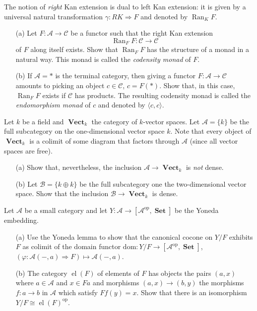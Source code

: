 \documentclass[12pt, a4paper]{article}
\DeclareMathOperator{\el}{el}
\DeclareMathOperator{\op}{op}
\DeclareMathOperator{\Ran}{Ran}
\DeclareMathOperator{\Vect}{\mathbf{Vect}}
\DeclareMathOperator{\Set}{\mathbf{Set}}
\newcommand{\ca}[1]{\mathscr{#1}}
\theoremstyle{plain}
\theoremstyle{definition}
\theoremstyle{citing}
\theoremstyle{citingdfn}
\numberwithin{equation}{section}
\begin{document}
\begin{question}
 The notion of \emph{right} Kan extension is dual to left Kan extension: it is given by a universal natural transformation $\gamma \colon RK \Rightarrow F$ and denoted by $\Ran_K F$.
 \begin{enumerate}
 \item[(a)] Let $F \colon \ca{A} \rightarrow \ca{C}$ be a functor such that the right Kan extension 
 \[
 \Ran_F F \colon \ca{C} \rightarrow \ca{C}
 \] 
 of $F$ along itself exists. Show that $\Ran_F F$ has the structure of a monad in a natural way. This monad is called the \emph{codensity monad} of $F$.
 \item[(b)] If $\ca{A}=\ast$ is the terminal category, then giving a functor $F \colon \ca{A} \rightarrow \ca{C}$ amounts to picking an object $c \in \ca{C}$, $c=F(\ast)$. Show that, in this case, $\Ran_F F$ exists if $\ca{C}$ has products. The resulting codensity monad is called the \emph{endomorphism monad} of $c$ and denoted by $\langle c,c\rangle$. 
\end{enumerate}  
\end{question}

\begin{question}
 Let $k$ be a field and $\Vect_{k}$ the category of $k$-vector spaces. Let $\ca{A}=\{k\}$ be the full subcategory on the one-dimensional vector space $k$. Note that every object of $\Vect_k$ is a colimit of some diagram that factors through $\ca{A}$ (since all vector spaces are free).
 
 \begin{enumerate}
 \item[(a)] Show that, nevertheless, the inclusion $\ca{A} \rightarrow \Vect_k$ is \emph{not} dense.
 
 \item[(b)] Let $\ca{B} =\{ k \oplus k\}$ be the full subcategory one the two-dimensional vector space. Show that the inclusion $\ca{B} \rightarrow \Vect_k$ is dense.
 \end{enumerate}
\end{question}


\begin{question}
  Let $\ca{A}$ be a small category and let $Y \colon \ca{A} \rightarrow [\ca{A}^{\op},\Set]$ be the Yoneda embedding. 
 \begin{enumerate} 
 \item[(a)] Use the Yoneda lemma to show that the canonical cocone on $Y \slash F$ exhibits $F$ as colimit of the domain functor $\mathrm{dom} \colon Y \slash F \rightarrow [\ca{A}^{\op},\Set]$, $(\varphi \colon \ca{A}(-,a) \Rightarrow F) \mapsto \ca{A}(-,a)$.
 
\item[(b)] The category $\el(F)$ of elements of $F$ has objects the pairs $(a,x)$ where $a \in \ca{A}$ and $x \in Fa$ and morphisms $(a,x) \rightarrow (b,y)$ the morphisms $f \colon a \rightarrow b$ in $\ca{A}$ which satisfy $Ff(y)=x$. Show that there is an isomorphism $Y \slash F \cong \el(F)^{\op}$.
 \end{enumerate}
\end{question}
\end{document}

